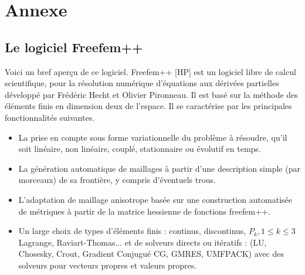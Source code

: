 \chapter*{Annexe}
\section*{Le logiciel Freefem++}
Voici un bref aperçu de ce logiciel.
Freefem++ [HP] est un logiciel libre de calcul scientifique, pour la résolution numérique d’équations aux dérivées partielles développé par Frédéric Hecht et Olivier Pironneau. Il est basé sur la méthode des éléments finis en dimension deux de l’espace. Il se caractérise par les principales fonctionnalités suivantes.
\begin{itemize}
\item La prise en compte sous forme variationnelle du problème à résoudre, qu’il soit linéaire, non linéaire, couplé, stationnaire ou évolutif en temps.
\item La génération automatique de maillages à partir d’une description simple (par morceaux) de sa frontière, y compris d’éventuels trous.
\item L’adaptation de maillage anisotrope basée sur une construction automatisée de métriques à partir de la matrice hessienne de fonctions freefem++.
\item Un large choix de types d’éléments finis : continus, discontinus, $P_k,1\leq k\leq3$ Lagrange, Raviart-Thomas... et de solveurs directs ou itératifs : (LU, Chosesky, Crout, Gradient Conjugué CG, GMRES, UMFPACK) avec des solveurs pour vecteurs propres et valeurs propres.
\end{itemize}
